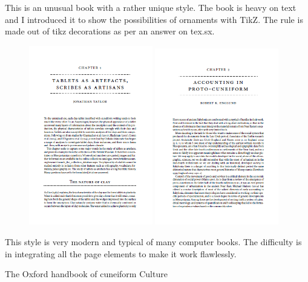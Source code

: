 This is an unusual book with a rather unique style. The book is heavy on text and I introduced it to show the possibilities of ornaments with TikZ. The rule is made out of tikz decorations as per an answer on tex.sx.
\begin{figure}[ht]
\includegraphics[width=0.48\textwidth]{./chapters/chapter48}\hfill
\includegraphics[width=0.48\textwidth]{./chapters/chapter48a}
\end{figure}

This style is very modern and typical of many computer books. The difficulty is in integrating all the page elements to make it work flawlessly.

The Oxford handbook of cuneiform Culture



